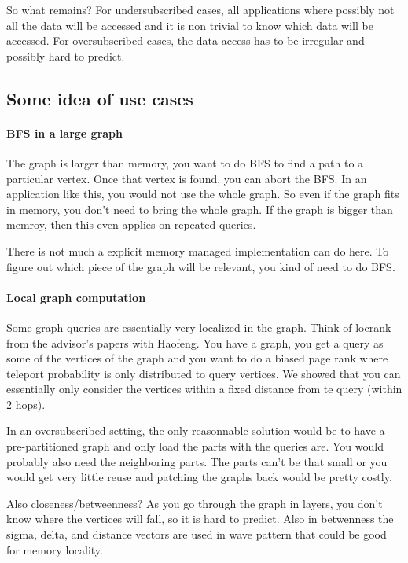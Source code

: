 \documentclass{article}
\begin{document}
So what remains? For undersubscribed cases, all applications where
possibly not all the data will be accessed and it is non trivial to
know which data will be accessed. For oversubscribed cases, the data
access has to be irregular and possibly hard to predict.

\subsection{Some idea of use cases}

\paragraph{BFS in a large graph}
The graph is larger than memory, you want to do BFS to find a path to
a particular vertex. Once that vertex is found, you can abort the
BFS. In an application like this, you would not use the whole
graph. So even if the graph fits in memory, you don't need to bring the
whole graph. If the graph is bigger than memroy, then this even
applies on repeated queries.

There is not much a explicit memory managed implementation can do
here. To figure out which piece of the graph will be relevant, you
kind of need to do BFS.

\paragraph{Local graph computation}
Some graph queries are essentially very localized in the graph. Think
of locrank from the advisor's papers with Haofeng. You have a graph,
you get a query as some of the vertices of the graph and you want to
do a biased page rank where teleport probability is only distributed
to query vertices. We showed that you can essentially only consider
the vertices within a fixed distance from te query (within 2 hops).

In an oversubscribed setting, the only reasonnable solution would be
to have a pre-partitioned graph and only load the parts with the
queries are. You would probably also need the neighboring parts. The
parts can't be that small or you would get very little reuse and
patching the graphs back would be pretty costly.

Also closeness/betweenness? As you go through the graph in layers, you
don't know where the vertices will fall, so it is hard to
predict. Also in betwenness the sigma, delta, and distance vectors are
used in wave pattern that could be good for memory locality.
\end{document}
